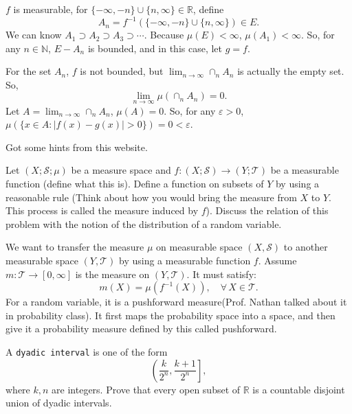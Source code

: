 \documentclass[12pt]{article}
\newenvironment{exercise}[1]{\begin{tcolorbox}[colback=black!15, colframe=black!80, breakable, title=#1]}{\end{tcolorbox}}
\newenvironment{proof}{\begin{tcolorbox}[colback=white, colframe=black!50, breakable, title=Proof. ]\setlength{\parskip}{0.8em}}{\,\\\rightline{$\square$}\end{tcolorbox}}
\newenvironment{solution}{\begin{tcolorbox}[colback=white, colframe=black!50, breakable, title=Solution. ]\setlength{\parskip}{0.8em}}{\end{tcolorbox}}
\begin{document}
    \begin{proof}
        $f$ is measurable, for $\{-\infty, -n\}\cup\{n,\infty\}\in\mathbb{R}$, define 
        \[A_n=f^{-1}(\{-\infty, -n\}\cup\{n,\infty\})\in E. \] 
        We can know $A_1\supset A_2\supset A_3\supset\cdots$. Because $\mu(E)<\infty$, $\mu(A_1)<\infty$. So, for any $n\in\mathbb{N}$, $E-A_n$ is bounded, and in this case, let $g=f$. 

        For the set $A_n$, $f$ is not bounded, but $\lim_{n\to\infty}\cap_nA_n$ is actually the empty set. So, \[\lim_{n\to\infty}\mu(\cap_nA_n)=0. \]
        Let $A=\lim_{n\to\infty}\cap_nA_n$, $\mu(A)=0$. So, for any $\varepsilon>0$, $\mu(\{x\in A:|f(x)-g(x)|>0\})=0<\varepsilon$. 

        Got some hints from this website. 
    \end{proof}

    \begin{exercise}{4}
        Let $(X; \mathscr{S}; \mu)$ be a measure space and $f : (X; \mathscr{S}) \to (Y; \mathscr{T} )$ be a measurable function (define what this is). Define a function on subsets of $Y$ by using a reasonable rule (Think about how you would bring the measure from $X$ to $Y$. This process is called the measure induced by $f$). Discuss the relation of this problem with the notion of the distribution of a random variable. 
    \end{exercise}

    \begin{solution}
        We want to transfer the measure $\mu$ on measurable space $(X,\mathscr{S})$ to another measurable space $(Y,\mathscr{T})$ by using a measurable function $f$. Assume $m: \mathscr{T}\to [0,\infty]$ is the measure on $(Y,\mathscr{T})$. It must satisfy: 
        \[m(X)=\mu(f^{-1}(X)),\quad \forall\, X\in\mathscr{T}. \]
        For a random variable, it is a pushforward measure(Prof. Nathan talked about it in probability class). It first maps the probability space into a space, and then give it a probability measure defined by this called pushforward. 
    \end{solution}

    \begin{exercise}{5}
        A \texttt{dyadic interval} is one of the form
        \[\left(\frac{k}{2^n}, \frac{k+1}{2^n}\right], \]
        where $k, n$ are integers. Prove that every open subset of $\mathbb{R}$ is a countable disjoint union of dyadic intervals. 
    \end{exercise}
\end{document}
